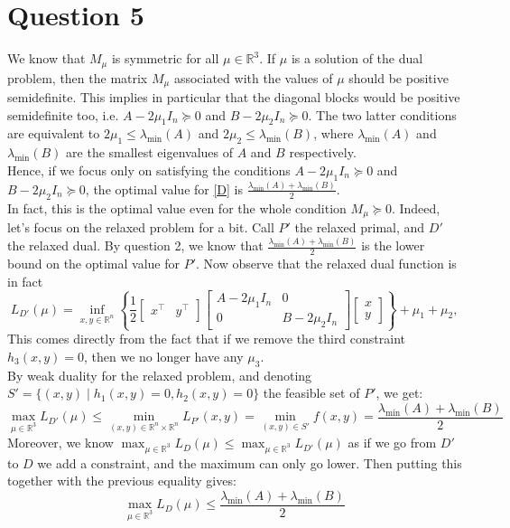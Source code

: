 \documentclass{article}
\newcommand{\R}{\mathbb{R}}
\newcommand{\tp}{^\top}
\begin{document}
\section*{Question 5}
We know that $M_\mu$ is symmetric for all $\mu\in\R^3$. If $\mu$ is a solution of the dual problem, then the matrix $M_\mu$ associated with the values of $\mu$ should be positive semidefinite. This implies in particular that the diagonal blocks would be positive semidefinite too, i.e. $A-2\mu_1 I_n\succeq 0$ and $B-2\mu_2 I_n \succeq 0$. The two latter conditions are equivalent to $2\mu_1\leq \lambda_{\min} (A)$ and $2\mu_2\leq \lambda_{\min}(B)$, where  $\lambda_{\min} (A)$ and $\lambda_{\min} (B)$ are the smallest eigenvalues of $A$ and $B$ respectively.\\
Hence, if we focus only on satisfying the conditions  $A-2\mu_1 I_n\succeq 0$ and $B-2\mu_2 I_n \succeq 0$, the optimal value for \eqref{D} is $\frac{\lambda_{\min} (A)+\lambda_{\min} (B)}{2}$. \\
In fact, this is the optimal value even for the whole condition $M_\mu\succeq 0$. Indeed, let's focus on the relaxed problem for a bit. Call $P'$ the relaxed primal, and $D'$ the relaxed dual. By question 2, we know that $\frac{\lambda_{\min} (A)+\lambda_{\min} (B)}{2}$ is the lower bound on the optimal value for $P'$. Now observe that the relaxed  dual function is in fact $$L_{D'} (\mu)= \inf\limits_{x,y\in\R^n} \left\lbrace \dfrac{1}{2} \begin{bmatrix} x\tp & y\tp\end{bmatrix}\begin{bmatrix} A-2\mu_1 I_n & 0 \\
0 & B-2\mu_2 I_n \end{bmatrix}\begin{bmatrix} x \\ y \end{bmatrix} \right\rbrace+\mu_1+\mu_2, $$
This comes directly from the fact that if we remove the third constraint $h_3(x,y)=0$, then we no longer have any $\mu_3$. \\

By weak duality for the relaxed problem, and denoting $S'=\{(x,y)\mid h_1(x,y)=0, h_2(x,y)=0\}$ the feasible set of $P'$, we get:
$$\max_{\mu\in\R^3} L_{D'}(\mu)\leq \min_{(x,y)\in\R^n\times\R^n}L_{P'}(x,y) = \min_{(x,y)\in S'} f(x,y) = \dfrac{\lambda_{\min} (A)+\lambda_{\min} (B)}{2}$$
Moreover, we know $\max_{\mu\in\R^3} L_{D}(\mu)\leq \max_{\mu\in\R^3} L_{D'}(\mu)$ as if we go from $D'$ to $D$ we add a constraint, and the maximum can only go lower. Then putting this together with the previous equality gives:
$$\max_{\mu\in\R^3} L_{D}(\mu)\leq \dfrac{\lambda_{\min} (A)+\lambda_{\min} (B)}{2}$$
\end{document}
